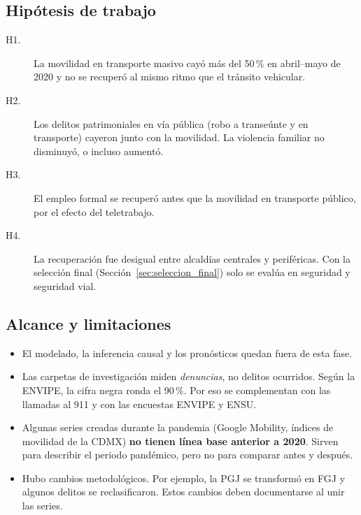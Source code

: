 \subsection{Hipótesis de trabajo}
\begin{description}
  \item[H1.] La movilidad en transporte masivo cayó más del 50\,\% en abril--mayo de 2020 y no se
             recuperó al mismo ritmo que el tránsito vehicular.
  \item[H2.] Los delitos patrimoniales en vía pública (robo a transeúnte y en transporte) cayeron junto
             con la movilidad. La violencia familiar no disminuyó, o incluso aumentó.
  \item[H3.] El empleo formal se recuperó antes que la movilidad en transporte público, por el efecto
             del teletrabajo.
  \item[H4.] La recuperación fue desigual entre alcaldías centrales y periféricas. Con la selección
             final (Sección~\ref{sec:seleccion_final}) solo se evalúa en seguridad y seguridad vial.
\end{description}

\subsection{Alcance y limitaciones}
\begin{itemize}
  \item El modelado, la inferencia causal y los pronósticos quedan fuera de esta fase.
  \item Las carpetas de investigación miden \emph{denuncias}, no delitos ocurridos. Según la ENVIPE,
        la cifra negra ronda el 90\,\%. Por eso se complementan con las llamadas al 911 y con las encuestas ENVIPE y ENSU.
  \item Algunas series creadas durante la pandemia (Google Mobility, índices de movilidad de la CDMX)
        \textbf{no tienen línea base anterior a 2020}. Sirven para describir el periodo pandémico, pero
        no para comparar antes y después.
  \item Hubo cambios metodológicos. Por ejemplo, la PGJ se transformó en FGJ y algunos delitos se
        reclasificaron. Estos cambios deben documentarse al unir las series.
\end{itemize}
